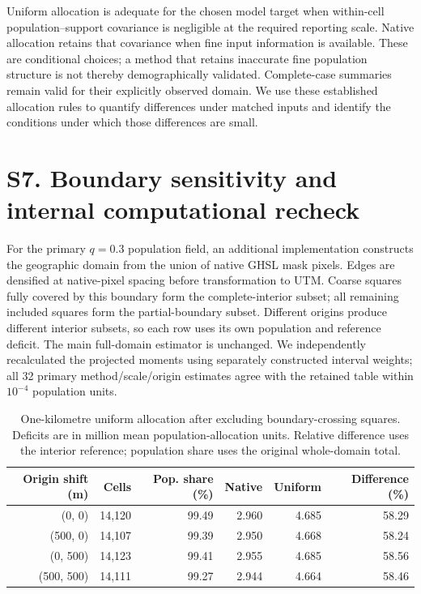 \documentclass[10pt,a4paper]{article}
\begin{document}
Uniform allocation is adequate for the chosen model target when within-cell population--support covariance is negligible at the required reporting scale. Native allocation retains that covariance when fine input information is available. These are conditional choices; a method that retains inaccurate fine population structure is not thereby demographically validated. Complete-case summaries remain valid for their explicitly observed domain. We use these established allocation rules to quantify differences under matched inputs and identify the conditions under which those differences are small.


\section*{S7. Boundary sensitivity and internal computational recheck}
For the primary $q=0.3$ population field, an additional implementation constructs the geographic domain from the union of native GHSL mask pixels. Edges are densified at native-pixel spacing before transformation to UTM. Coarse squares fully covered by this boundary form the complete-interior subset; all remaining included squares form the partial-boundary subset. Different origins produce different interior subsets, so each row uses its own population and reference deficit. The main full-domain estimator is unchanged. We independently recalculated the projected moments using separately constructed interval weights; all 32 primary method/scale/origin estimates agree with the retained table within $10^{-4}$ population units.

\begin{table}[htbp]\centering\small
\caption{One-kilometre uniform allocation after excluding boundary-crossing squares. Deficits are in million mean population-allocation units. Relative difference uses the interior reference; population share uses the original whole-domain total.}
\begin{tabular}{rrrrrr}\toprule
Origin shift (m) & Cells & Pop. share (\%) & Native & Uniform & Difference (\%)\\\midrule
(0, 0) & 14,120 & 99.49 & 2.960 & 4.685 & 58.29\\
(500, 0) & 14,107 & 99.39 & 2.950 & 4.668 & 58.24\\
(0, 500) & 14,123 & 99.41 & 2.955 & 4.685 & 58.56\\
(500, 500) & 14,111 & 99.27 & 2.944 & 4.664 & 58.46\\
\bottomrule\end{tabular}

\end{table}
\end{document}
